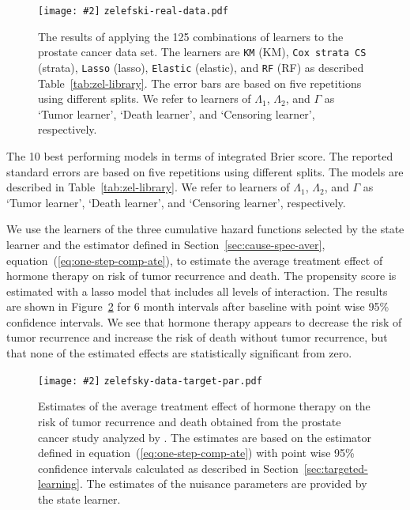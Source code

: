 \documentclass[unnumsec,webpdf,contemporary,large,namedate]{oup-authoring-template}%
\theoremstyle{thmstyleone}%
\theoremstyle{thmstyletwo}%
\theoremstyle{thmstylethree}%
\newcommand{\includeFigCond}[2][]{
  \ifx\nofig\undefined %
    \texttt{[image: \#2]} %
  \else %
    \texttt{#2} %
  \fi %
}
\newcommand{\1}{\mathds{1}}
\begin{document}
\begin{figure}
  \centering %
  \includeFigCond[width=.9\linewidth]{zelefski-real-data.pdf}
  \caption[]{The results of applying the 125 combinations of learners to the
    prostate cancer data set. The learners are \texttt{KM} (KM), \texttt{Cox
      strata CS} (strata), \texttt{Lasso} (lasso), \texttt{Elastic} (elastic),
    and \texttt{RF} (RF) as described Table~\ref{tab:zel-library}. The error
    bars are based on five repetitions using different splits. We refer to
    learners of \( \Lambda_1 \), \( \Lambda_2 \), and $\Gamma$ as `Tumor
    learner', `Death learner', and `Censoring learner', respectively.}
  \label{fig:zelefski-real}
\end{figure}


\begin{table}
  \caption{\label{tab:zelefski-real}The 10 best performing models in terms of integrated Brier score. The
    reported standard errors are based on five repetitions using different
    splits. The models are described in Table~\ref{tab:zel-library}. We refer to
    learners of \( \Lambda_1 \), \( \Lambda_2 \), and $\Gamma$ as `Tumor
    learner', `Death learner', and `Censoring learner', respectively.}
  \centering
  
\end{table}



We use the learners of the three cumulative hazard functions
selected by the state learner and the estimator defined in
Section~\ref{sec:cause-spec-aver}, equation~(\ref{eq:one-step-comp-ate}), to
estimate the average treatment effect of hormone therapy on risk of tumor
recurrence and death. The propensity score is estimated with a lasso model that
includes all levels of interaction. The results are shown in
Figure~\ref{fig:zelefski-real-target} for 6 month intervals after baseline with
point wise 95\% confidence intervals. We see that hormone therapy appears to
decrease the risk of tumor recurrence and increase the risk of death without
tumor recurrence, but that none of the estimated effects are statistically
significant from zero.

\begin{figure}
  \centering%
  \includeFigCond[width=.8\linewidth]{zelefsky-data-target-par.pdf}
  \caption[]{Estimates of the average treatment effect of hormone therapy on the
    risk of tumor recurrence and death obtained from the prostate cancer study
    analyzed by \cite{kattan2000pretreatment}. The estimates are based on the
    estimator defined in equation~(\ref{eq:one-step-comp-ate}) with point wise
    95\% confidence intervals calculated as described in
    Section~\ref{sec:targeted-learning}. The estimates of the nuisance
    parameters are provided by the state learner.}
  \label{fig:zelefski-real-target}
\end{figure}
\end{document}
